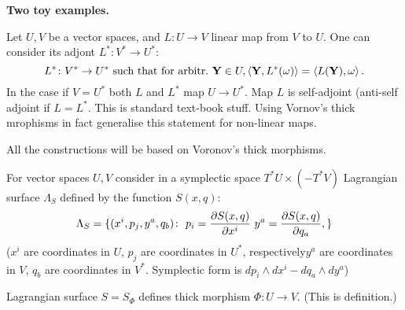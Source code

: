 





\baselineskip=17pt



\def\vare {\varepsilon}
\def\A {{\bf A}}
\def\t {\tilde}
\def\a {\alpha}
\def\K {{\bf K}}
\def\N {{\bf N}}
\def\V {{\cal V}}
\def\s {{\sigma}}
\def\S {{\bf S}}
\def\s {{\sigma}}
\def\bs {{\bf s}}
\def\p{\partial}
\def\vare{{\varepsilon}}
\def\Q {{\bf Q}}
\def\D {{\cal D}}
\def\L {{\cal L}}
\def\G {{\Gamma}}
\def\C {{\bf C}}
\def\M {{\cal M}}
\def\Z {{\bf Z}}
\def\U  {{\cal U}}
\def\H {{\cal H}}
\def\R  {{\bf R}}
\def\E  {{\bf E}}
\def\l {\lambda}
\def\degree {{\bf {\rm degree}\,\,}}
\def \finish {${\,\,\vrule height1mm depth2mm width 8pt}$}
\def \m {\medskip}
\def\p {\partial}
\def\r {{\bf r}}
\def\v {{\bf v}}
\def\n {{\bf n}}
\def\t {{\bf t}}
\def\b {{\bf b}}
\def\e{{\bf e}}
\def\f{{\bf f}}
\def\ac {{\bf a}}
\def \X   {{\bf X}}
\def \Y   {{\bf Y}}
\def\diag {\rm diag\,\,}
\def\pt {{\bf p}}
\def\w {\omega}
\def\la{\langle}
\def\ra{\rangle}
\def\x{{\bf x}}
\def\m {\medskip}
\def\thick {{\buildrel \to\over \to}}

  \centerline{\bf Two toy examples.}

 Let $U,V$ be a vector spaces, and $L\colon U\to V$ linear map from
   $V$ to $U$. One can consider its adjont $L^*\colon V^*\to U^*$:
                      $$
L^*\colon V^*\to U^*\,\, \hbox {such that for arbitr.}\,\,
     \Y\in U, \langle\Y, L^*(\w) \rangle
              =\langle L(\Y), \w \rangle\,.
                      $$
  In the case if $V=U^*$ both  $L$ and $L^*$
map $U\to U^*$.
  Map $L$ is self-adjoint (anti-self adjoint if $L=L^*$.
   This is standard text-book stuff. Using
   Vornov's thick mrophisms in fact generalise
this statement for non-linear maps.

   All the constructions will be based on
   Voronov's thick morphisms.

        For vector spaces
 $U,V$ consider in a symplectic space $T^*U\times (-T^*V)$
   Lagrangian surface $\Lambda_S$ defined by the function  $S(x,q)$:
                  $$
 \Lambda_S=\{(x^i,p_j,y^a,q_b)\colon\,\, p_i={\p S(x,q)\over \p x^i}\,\,
    y^a={\p S(x,q)\over \p q_a},\}
                 $$
($x^i$ are coordinates in $U$, $p_j$ are coordinates in $U^*$, 
respectively$y^a$ are coordinates in $V$, $q_b$ are coordinates in $V^*$.
Symplectic form is $dp_i\wedge dx^i-dq_a\wedge dy^a$)

  Lagrangian surface $S=S_\Phi$ defines thick morphism $\Phi\colon U\to V$.
    (This is definition.)

